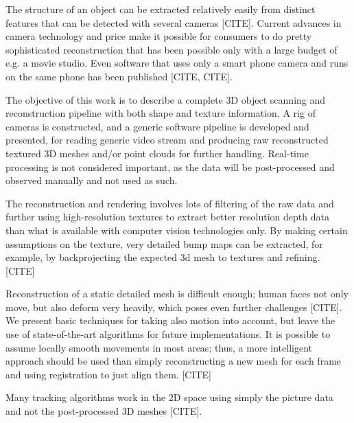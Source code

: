 The structure of an object can be extracted relatively easily from distinct features that can be detected with several cameras [CITE].
Current advances in camera technology and price make it possible for consumers to do pretty sophisticated reconstruction that has been possible only with a large budget of e.g. a movie studio.
Even software that uses only a smart phone camera and runs on the same phone has been published [CITE, CITE].

The objective of this work is to describe a complete 3D object scanning and reconstruction pipeline with both shape and texture information.
A rig of cameras is constructed, and a generic software pipeline is developed and presented, for reading generic video stream and producing raw reconstructed textured 3D meshes and/or point clouds for further handling.
Real-time processing is not considered important, as the data will be post-processed and observed manually and not used as such.

The reconstruction and rendering involves lots of filtering of the raw data and further using high-resolution textures to extract better resolution depth data than what is available with computer vision technologies only.
By making certain assumptions on the texture, very detailed bump maps can be extracted, for example, by backprojecting the expected 3d mesh to textures and refining. [CITE]

Reconstruction of a static detailed mesh is difficult enough; human faces not only move, but also deform very heavily, which poses even further challenges [CITE].
We present basic techniques for taking also motion into account, but leave the use of state-of-the-art algorithms for future implementations.
It is possible to assume locally smooth movements in most areas; thus, a more intelligent approach should be used than simply reconstructing a new mesh for each frame and using registration to just align them. [CITE]

Many tracking algorithms work in the 2D space using simply the picture data and not the post-processed 3D meshes [CITE].

